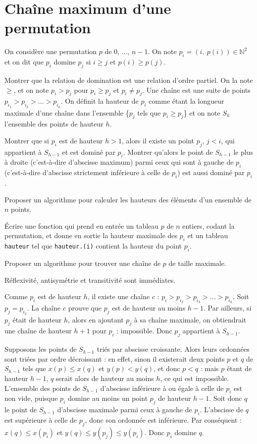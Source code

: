 \renewcommand{\SourceFile}{3-strategies-gloutonnes/src/3-2.ml}

\section{Chaîne maximum d'une permutation}

On considère une permutation $p$ de 0, ..., $n-1$. On note $p_i=(i,\ p(i)) \in \mathbb{N}^2$ et on dit que $p_i$ domine $p_j$ si $i \geq j$ et $p(i) \geq p(j)$.

\Q
Montrer que la relation de domination est une relation d'ordre partiel. On la note $\geq$, et on note $p_i > p_j$ pour $p_i \geq p_j$ et $p_i \neq p_j$. Une chaîne est une suite de points $p_{i_1} > p_{i_2} > ... > p_{i_k}$. On définit la hauteur de $p_i$ comme étant la longueur maximale d'une chaîne dans l'ensemble \{$p_j$ tels que $p_i \geq p_j$\} et on note $S_h$ l'ensemble des points de hauteur $h$.

\Q
Montrer que si $p_i$ est de hauteur $h > 1$, alors il existe un point $p_j$, $j < i$, qui appartient à $S_{h-1}$ et est dominé par $p_i$. Montrer qu'alors le point de $S_{h-1}$ le plus à droite (c'est-à-dire d'abscisse maximum) parmi ceux qui sont à gauche de $p_i$ (c'est-à-dire d'abscisse strictement inférieure à celle de $p_i$) est aussi dominé par $p_i$.

\Q
Proposer un algorithme pour calculer les hauteurs des éléments d'un ensemble de $n$ points.

\Q
Écrire une fonction qui prend en entrée un tableau $p$ de $n$ entiers, codant la permutation, et donne en sortie la hauteur maximale des $p_i$ et un tableau \texttt{hauteur} tel que \texttt{hauteur.(i)} contient la hauteur du point $p_i$.

\Q
Proposer un algorithme pour trouver une chaîne de $p$ de taille maximale.

\Corrige

\Q
Réflexivité, antisymétrie et transitivité sont immédiates.

\Q
Comme $p_i$ est de hauteur $h$, il existe une chaîne $c$ : $p_i > p_{i_2}> p_{i_3} > ... > p_{i_h}$. Soit $p_j=p_{i_2}$. La chaîne $c$ prouve que $p_j$ est de hauteur au moins $h-1$. Par ailleurs, si $p_j$ était de hauteur $h$, alors en ajoutant $p_j$ à sa chaîne maximale, on obtiendrait une chaîne de hauteur $h+1$ pour $p_i$ : impossible. Donc $p_j$ appartient à $S_{h-1}$.
\smallskip

Supposons les points de $S_{h-1}$ triés par abscisse croissante. Alors leurs ordonnées sont triées par ordre décroissant : en effet, sinon il existerait deux points $p$ et $q$ de $S_{h-1}$ tels que $x(p) \leq x(q)$ et $y(p) < y(q)$, et donc $p < q$ : mais $p$ étant de hauteur $h-1$, $q$ serait alors de hauteur au moins $h$, ce qui est impossible. L'ensemble des points de $S_{h-1}$ d'abscisse inférieure à ou égale à celle de $p_i$ est non vide, puisque $p_i$ domine au moins un point $p_j$ de hauteur $h-1$. Soit donc $q$ le point de $S_{h-1}$ d'abscisse maximale parmi ceux à gauche de $p_i$. L'abscisse de $q$ est supérieure à celle de $p_j$, donc son ordonnée est inférieure. Par conséquent : $x(q) \leq x(p_i)$ et $y(q) \leq y(p_j) \leq y(p_i)$. Donc $p_i$ domine $q$.
\medskip

